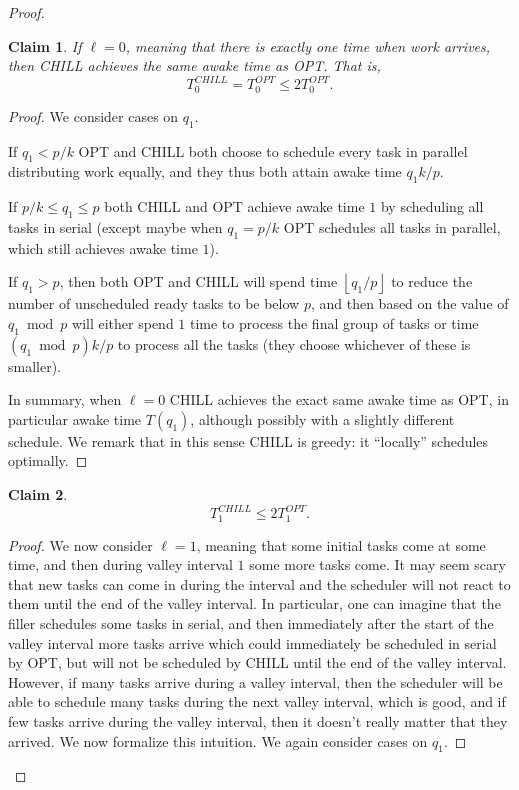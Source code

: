 \documentclass[twocolumn]{article}[11pt]
\newcommand{\floor}[1]{\left\lfloor #1 \right\rfloor}
\newtheorem{clm}{Claim}
\begin{document}
\begin{proof}
  \begin{clm}
    \label{clm:l=0}
   If $\ell = 0$, meaning that there is exactly one time when work
  arrives, then CHILL achieves the same awake time as OPT. 
  That is, 
  $$T_0^{CHILL} = T_0^{OPT} \le 2T_0^{OPT}.$$
  \end{clm}
  \begin{proof}
  We consider cases on $q_1$. 

  If $q_1 < p/k$ OPT and CHILL both choose to schedule every task
  in parallel distributing work equally, and they thus both
  attain awake time $q_1 k/p$.

  If $p/k \le q_1 \le p$ both CHILL and OPT achieve awake time
  $1$ by scheduling all tasks in serial (except maybe when $q_1 =
  p/k$ OPT schedules all tasks in parallel, which still achieves
  awake time $1$). 

  If $q_1 > p$, then both OPT and CHILL will
  spend time $\floor{q_1/p}$ to reduce the number of unscheduled
  ready tasks to be below $p$, and then based on the value of
  $q_1\bmod p$ will either spend $1$ time to process the final
  group of tasks or time $(q_1\bmod p) k/p$ to process all the
  tasks (they choose whichever of these is smaller). 

  In summary, when $\ell=0$ CHILL achieves the exact same awake
  time as OPT, in particular awake time $T(q_1)$, although
  possibly with a slightly different schedule. We remark that in
  this sense CHILL is greedy: it \enquote{locally} schedules
  optimally. 
    
  \end{proof}

  \begin{clm}
    \label{clm:l=1}
    $$T_1^{CHILL} \le 2T_1^{OPT}.$$
  \end{clm}
  \begin{proof}
  We now consider $\ell=1$, meaning that some initial tasks come at
  some time, and then during valley interval $1$ some more tasks
  come. It may seem scary that new tasks can come in during the
  interval and the scheduler will not react to them until the end
  of the valley interval. In particular, one can imagine that the
  filler schedules some tasks in serial, and then immediately
  after the start of the valley interval more tasks arrive which
  could immediately be scheduled in serial by OPT, but will not
  be scheduled by CHILL until the end of the valley interval.
  However, if many tasks arrive during a valley interval, then
  the scheduler will be able to schedule many tasks during the
  next valley interval, which is good, and if few tasks arrive
  during the valley interval, then it doesn't really matter that
  they arrived. We now formalize this intuition. We again
  consider cases on $q_1$.


\end{proof}
\end{proof}
\end{document}
